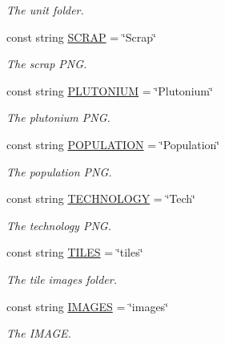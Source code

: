 \begin{DoxyCompactItemize}
\begin{DoxyCompactList}\small\item\em The unit folder. \end{DoxyCompactList}\item 
const string \hyperlink{classClient_1_1Common_1_1Constants_1_1ClientConstants_a4dbf6aab0cfaf32bde33786ce254a15c}{S\+C\+R\+A\+P} = \char`\"{}Scrap\char`\"{}
\begin{DoxyCompactList}\small\item\em The scrap P\+N\+G. \end{DoxyCompactList}\item 
const string \hyperlink{classClient_1_1Common_1_1Constants_1_1ClientConstants_a86ed3d6f7915b53dbe14380c01527f9a}{P\+L\+U\+T\+O\+N\+I\+U\+M} = \char`\"{}Plutonium\char`\"{}
\begin{DoxyCompactList}\small\item\em The plutonium P\+N\+G. \end{DoxyCompactList}\item 
const string \hyperlink{classClient_1_1Common_1_1Constants_1_1ClientConstants_a2a16ab5fc539924d9a461218425ff6ab}{P\+O\+P\+U\+L\+A\+T\+I\+O\+N} = \char`\"{}Population\char`\"{}
\begin{DoxyCompactList}\small\item\em The population P\+N\+G. \end{DoxyCompactList}\item 
const string \hyperlink{classClient_1_1Common_1_1Constants_1_1ClientConstants_aa3ee0e61566e5ac804d7f2d5ba78f29c}{T\+E\+C\+H\+N\+O\+L\+O\+G\+Y} = \char`\"{}Tech\char`\"{}
\begin{DoxyCompactList}\small\item\em The technology P\+N\+G. \end{DoxyCompactList}\item 
const string \hyperlink{classClient_1_1Common_1_1Constants_1_1ClientConstants_accb6c4f84c01e8e4adf87217b07985c0}{T\+I\+L\+E\+S} = \char`\"{}tiles\char`\"{}
\begin{DoxyCompactList}\small\item\em The tile images folder. \end{DoxyCompactList}\item 
const string \hyperlink{classClient_1_1Common_1_1Constants_1_1ClientConstants_a6caf05ca06a1a0cb2126af856408cec5}{I\+M\+A\+G\+E\+S} = \char`\"{}images\char`\"{}
\begin{DoxyCompactList}\small\item\em The I\+M\+A\+G\+E. \end{DoxyCompactList}\item 

\end{DoxyCompactItemize}
